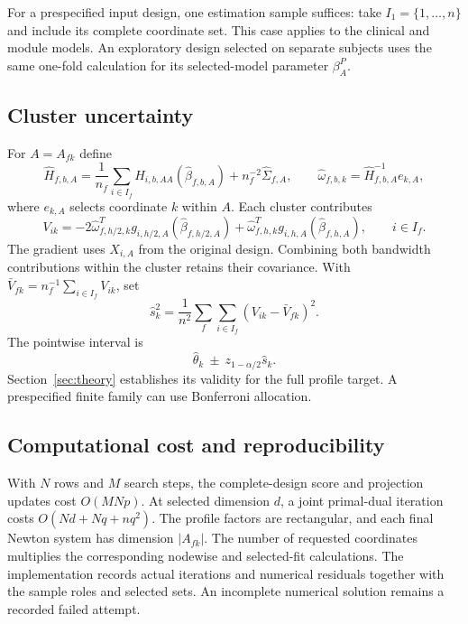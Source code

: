 For a prespecified input design, one estimation sample suffices:
take $I_1=\{1,\ldots,n\}$ and include its complete coordinate set.
This case applies to the clinical and module models. An exploratory
design selected on separate subjects uses the same one-fold
calculation for its selected-model parameter $\beta_A^P$.

\subsection{Cluster uncertainty}\label{subsec:variance}

For $A=A_{fk}$ define
\[
 \widehat H_{f,b,A}=\frac1{n_f}\sum_{i\in I_f}
          H_{i,b,AA}(\widehat\beta_{f,b,A})+n_f^{-2}\widehat\Sigma_{f,A},
 \qquad
 \widehat\omega_{f,b,k}=\widehat H_{f,b,A}^{-1}e_{k,A},
\]
where $e_{k,A}$ selects coordinate $k$ within $A$. Each cluster contributes
\begin{equation}\label{eq:joint-influence}
 V_{ik}=-2\widehat\omega_{f,h/2,k}^T
               g_{i,h/2,A}(\widehat\beta_{f,h/2,A})
          +\widehat\omega_{f,h,k}^T
               g_{i,h,A}(\widehat\beta_{f,h,A}),\qquad i\in I_f.
\end{equation}
The gradient uses $X_{i,A}$ from the original design. Combining both
bandwidth contributions within the cluster retains their covariance.
With $\bar V_{fk}=n_f^{-1}\sum_{i\in I_f}V_{ik}$, set
\begin{equation}\label{eq:variance-estimator}
 \widehat s_k^2=\frac1{n^2}\sum_f\sum_{i\in I_f}
                        (V_{ik}-\bar V_{fk})^2.
\end{equation}
The pointwise interval is
\begin{equation}\label{eq:ci}
 \widehat\theta_k\ \pm\ z_{1-\alpha/2}\widehat s_k.
\end{equation}
Section~\ref{sec:theory} establishes its validity for the full profile
target. A prespecified finite family can use Bonferroni allocation.

\subsection{Computational cost and reproducibility}\label{subsec:implementation}

With $N$ rows and $M$ search steps, the complete-design score and
projection updates cost $O(MNp)$. At selected dimension $d$, a joint
primal-dual iteration costs $O(Nd+Nq+nq^2)$. The profile factors are
rectangular, and each final Newton system has dimension $|A_{fk}|$.
The number of requested coordinates multiplies the corresponding
nodewise and selected-fit calculations. The implementation records
actual iterations and numerical residuals together with the sample
roles and selected sets. An incomplete numerical solution remains a
recorded failed attempt.

